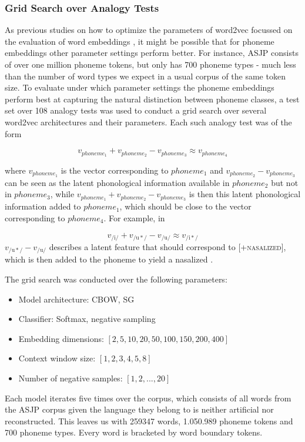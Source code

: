 \documentclass[6pt]{article}
\begin{document}
\subsubsection{Grid Search over Analogy Tests}
As previous studies on how to optimize the parameters of word2vec focussed on the evaluation of word embeddings \citep{mikolov2013distributed,mikolov2013efficient}, it might be possible that for phoneme embeddings other parameter settings perform better. For instance, ASJP consists of over one million phoneme tokens, but only has 700 phoneme types - much less than the number of word types we expect in a usual corpus of the same token size. 
To evaluate under which parameter settings the phoneme embeddings perform best at  capturing the natural distinction between phoneme classes, a test set over 108 analogy tests was used to conduct a grid search over several word2vec architectures and their parameters. Each such analogy test was of the form

\begin{equation}
v_{phoneme_1} + v_{phoneme_2} -  v_{phoneme_3} \approx v_{phoneme_4}
\end{equation} 

\noindent where $v_{phoneme_1}$ is the vector corresponding to $phoneme_1$ and $v_{phoneme_2} -  v_{phoneme_3}$ can be seen as the latent phonological information available in $phoneme_2$ but not in $phoneme_3$,  while $v_{phoneme_1} + v_{phoneme_2} -  v_{phoneme_3}$ is then this latent phonological information added to $phoneme_1$, which should be close to the vector corresponding to $phoneme_4$. For example, in

\begin{equation}
v_{\mathrm{/i/} } + v_{\mathrm{/u*/} } -  v_{\mathrm{/u/} } \approx v_{\mathrm{/i*/} }
\end{equation}
$v_{\mathrm{/u*/} } -  v_{\mathrm{/u/} }$ describes a latent feature that should correspond to \textsc{[+nasalized]}, which is then added to the phoneme  to yield a nasalized .

The grid search was conducted over the following parameters:
\begin{itemize}
\item Model architecture: CBOW, SG
\item Classifier: Softmax, negative sampling
\item Embedding dimensions: $[2, 5,10, 20, 50, 100, 150, 200, 400 ]$
\item Context window size: $[1,2,3,4,5,8]$
\item Number of negative samples: $[1,2, ..., 20]$
\end{itemize}
 Each model iterates five times over the corpus, which consists of all words from the ASJP corpus given the language they belong to is neither artificial nor reconstructed. This leaves us with 259347 words, 1.050.989 phoneme tokens and 700 phoneme types. Every word is bracketed by word boundary tokens.
\end{document}
